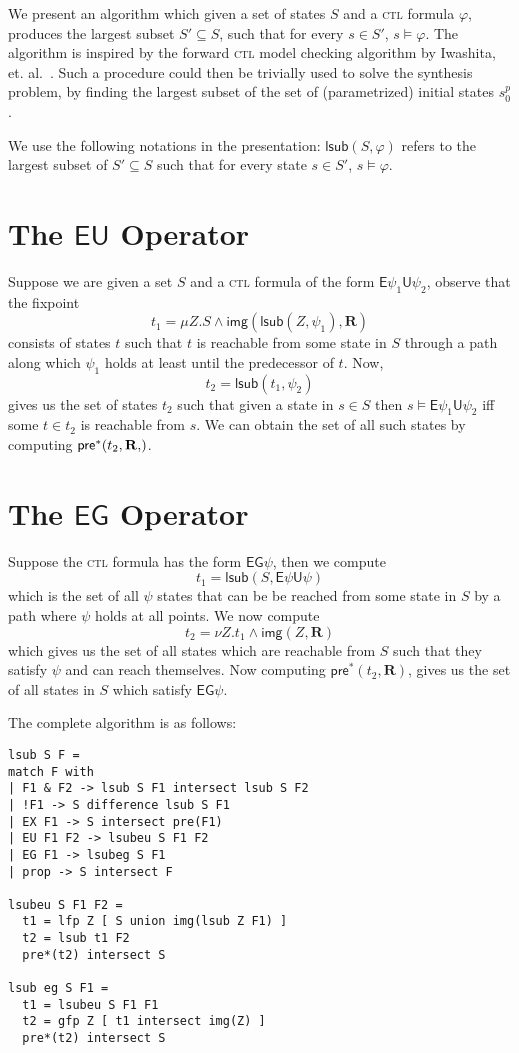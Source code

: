 \documentclass[10pt]{article}
\newcommand{\ctl}{\textsc{ctl}\xspace}
\newcommand{\ctrans}{\ensuremath{\mathbf{R}}\xspace}
\newcommand{\eg}[1]{\ensuremath{\mathsf{EG}#1\xspace}}
\newcommand{\eu}[2]{\ensuremath{\mathsf{E}#1 \mathsf{U} #2\xspace}}
\newcommand{\post}[2]{\ensuremath{\mathsf{img}(#1, #2)}\xspace}
\newcommand{\prestar}[2]{\ensuremath{\mathsf{pre}^*(#1, #2)}\xspace}
\newcommand{\lsub}[2]{\ensuremath{\mathsf{lsub}(#1, #2)}\xspace}
\begin{document}
\begin{spacing}{1}
We present an algorithm which given a set of states $S$ and a \ctl formula
$\varphi$, produces the largest subset $S' \subseteq S$, such that for
every $s \in S'$, $s \models \varphi$. The algorithm is inspired by the
forward \ctl model checking algorithm by Iwashita,
et. al.~\cite{ctl-forward}. Such a procedure could then be trivially used
to solve the synthesis problem, by finding the largest subset of the set of
(parametrized) initial states $s_0^p$.

We use the following notations in the presentation: \lsub{S}{\varphi}
refers to the largest subset of $S' \subseteq S$ such that for every state
$s \in S'$, $s \models \varphi$.

\section{The \eu{}{} Operator}
Suppose we are given a set $S$ and a \ctl formula of the form
\eu{\psi_1}{\psi_2}, observe that the fixpoint
$$t_1 = \mu Z. S \wedge \post{\lsub{Z}{\psi_1}}{\ctrans}$$
consists of states $t$ such that $t$ is reachable from some state in $S$
through a path along which $\psi_1$ holds at least until the predecessor of
$t$. Now,
$$t_2 = \lsub{t_1}{\psi_2}$$ gives us the set of states $t_2$ such that
given a state in $s \in S$ then $s \models \eu{\psi_1}{\psi_2}$ iff
some $t \in t_2$ is reachable from $s$. We can obtain the set of all
such states by computing $\prestar{t_2, \ctrans}$.

\section{The \eg{} Operator}
Suppose the \ctl formula has the form $\eg{\psi}$, then we compute
$$t_1 = \lsub{S}{\eu{\psi}{\psi}}$$
which is the set of all $\psi$ states that can be be reached from some
state in $S$ by a path where $\psi$ holds at all points. We now
compute 
$$t_2 = \nu Z. t_1 \wedge \post{Z}{\ctrans}$$
which gives us the set of all states which are reachable from $S$ such
that they satisfy $\psi$ and can reach themselves. Now computing
$\prestar{t_2}{\ctrans}$, gives us the set of all states in $S$ which
satisfy $\eg{\psi}$.

The complete algorithm is as follows:
\begin{verbatim}
lsub S F =
match F with
| F1 & F2 -> lsub S F1 intersect lsub S F2
| !F1 -> S difference lsub S F1
| EX F1 -> S intersect pre(F1)
| EU F1 F2 -> lsubeu S F1 F2
| EG F1 -> lsubeg S F1
| prop -> S intersect F

lsubeu S F1 F2 =
  t1 = lfp Z [ S union img(lsub Z F1) ]
  t2 = lsub t1 F2
  pre*(t2) intersect S

lsub eg S F1 =
  t1 = lsubeu S F1 F1
  t2 = gfp Z [ t1 intersect img(Z) ]
  pre*(t2) intersect S
\end{verbatim}




\end{spacing}
\end{document}
